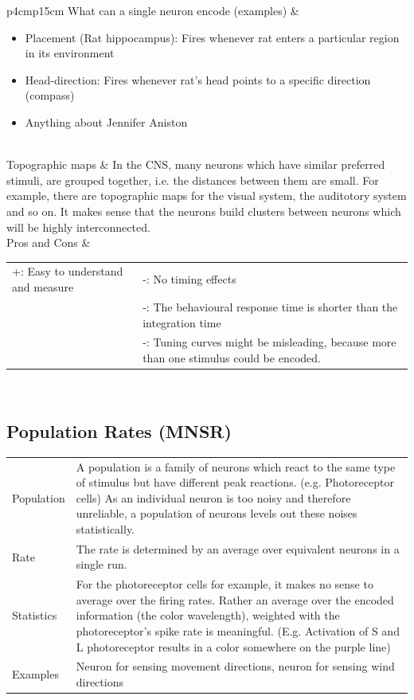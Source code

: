 \begin{longtable}{p{4cm}p{15cm}}
What can a single neuron encode (examples)	& \begin{itemize}
                               	  	\item Placement (Rat hippocampus): Fires whenever rat enters a particular region in its environment
					\item Head-direction: Fires whenever rat's head points to a specific direction (compass)
					\item Anything about Jennifer Aniston
                               	  \end{itemize}\\
Topographic maps		& In the CNS, many neurons which have similar preferred stimuli, are grouped together, i.e. the distances between them are small. For example, there are topographic maps for the visual system, the auditotory system and so on. It makes sense that the neurons build clusters between neurons which will be highly interconnected.\\
Pros and Cons			& \begin{tabular}[t]{p{7cm}p{7cm}}
				    +: Easy to understand and measure	& -: No timing effects\\
									& -: The behavioural response time is shorter than the integration time\\
									& -: Tuning curves might be misleading, because more than one stimulus could be encoded.
				  \end{tabular}\\
\end{longtable}
\subsection{Population Rates (MNSR)}
\begin{tabular}{p{4cm}p{15cm}}
Population	& A population is a family of neurons which react to the same type of stimulus but have different peak reactions. (e.g. Photoreceptor cells) As an individual neuron is too noisy and therefore unreliable, a population of neurons levels out these noises statistically.\\
Rate		& The rate is determined by an average over equivalent neurons in a single run.\\
Statistics	& For the photoreceptor cells for example, it makes no sense to average over the firing rates. Rather an average over the encoded information (the color wavelength), weighted with the photoreceptor's spike rate is meaningful. (E.g. Activation of S and L photoreceptor results in a color somewhere on the purple line)\\
Examples	& Neuron for sensing movement directions, neuron for sensing wind directions
\end{tabular}
